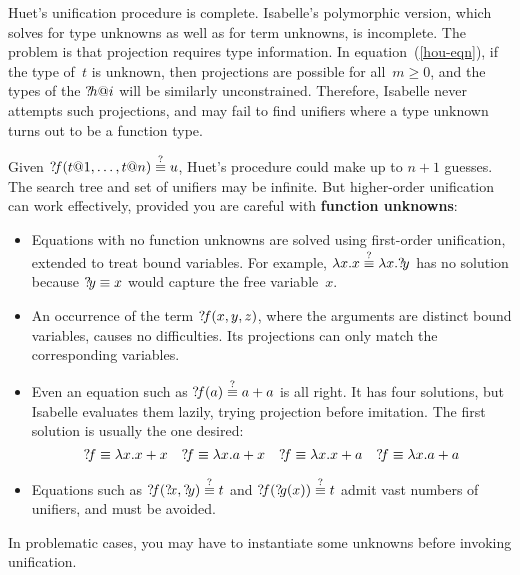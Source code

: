 \begin{warn}
    Huet's unification procedure is complete. Isabelle's polymorphic version,
    which solves for type unknowns as well as for term unknowns, is incomplete.
    The problem is that projection requires type information. In
    equation~(\ref{hou-eqn}), if the type of~$t$ is unknown, then projections
    are possible for all~$m\geq0$, and the types of the ${?\!h@i}$ will be
    similarly unconstrained. Therefore, Isabelle never attempts such
    projections, and may fail to find unifiers where a type unknown turns out
    to be a function type.
\end{warn}

Given ${?\!f}(t@1,\ldots,t@n)\stackrel{?}{\equiv} u$, Huet's procedure could make up to
$n+1$ guesses. The search tree and set of unifiers may be infinite. But
higher-order unification can work effectively, provided you are careful
with {\bf function unknowns}:
\begin{itemize}
    \item Equations with no function unknowns are solved using first-order
    unification, extended to treat bound variables. For example, $\lambda x.x
    \stackrel{?}{\equiv} \lambda x.{?\!y}$ has no solution because ${?\!y}\equiv x$ would
    capture the free variable~$x$.

    \item An occurrence of the term ${?\!f}(x,y,z)$, where the arguments are
    distinct bound variables, causes no difficulties. Its projections can only
    match the corresponding variables.

    \item Even an equation such as ${?\!f}(a)\stackrel{?}{\equiv} a+a$ is all right. It has
    four solutions, but Isabelle evaluates them lazily, trying projection before
    imitation. The first solution is usually the one desired:
    \[ {?\!f}\equiv \lambda x. x+x \quad
    {?\!f}\equiv \lambda x. a+x \quad
    {?\!f}\equiv \lambda x. x+a \quad
    {?\!f}\equiv \lambda x. a+a \]
    \item  Equations such as ${?\!f}({?\!x},{?\!y})\stackrel{?}{\equiv} t$ and
    ${?\!f}({?\!g}(x))\stackrel{?}{\equiv} t$ admit vast numbers of unifiers, and must be
    avoided.
\end{itemize}
In problematic cases, you may have to instantiate some unknowns before
invoking unification.

